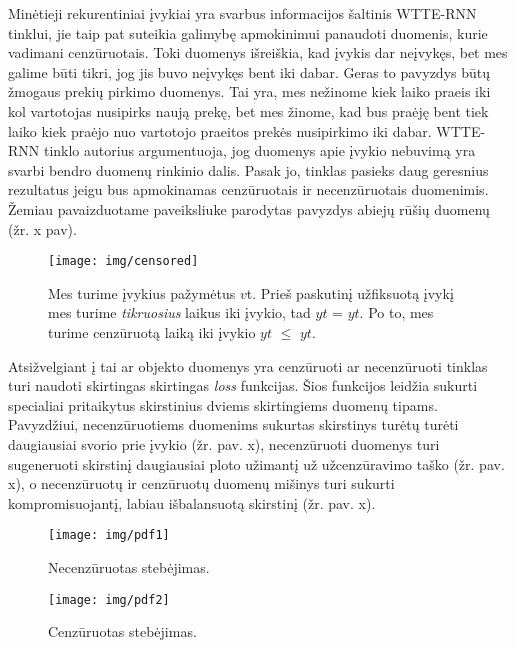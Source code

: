 \documentclass{VUMIFPSkursinis}
\begin{document}
Minėtieji rekurentiniai įvykiai yra svarbus informacijos šaltinis WTTE-RNN tinklui, jie taip pat suteikia galimybę apmokinimui panaudoti duomenis, kurie vadimani cenzūruotais. Toki duomenys išreiškia, kad įvykis dar neįvykęs, bet mes galime būti tikri, jog jis buvo neįvykęs bent iki dabar. Geras to pavyzdys būtų žmogaus prekių pirkimo duomenys. Tai yra, mes nežinome kiek laiko praeis iki kol vartotojas nusipirks naują prekę, bet mes žinome, kad bus praėję bent tiek laiko kiek praėjo nuo vartotojo praeitos prekės nusipirkimo iki dabar. WTTE-RNN tinklo autorius argumentuoja, jog duomenys apie įvykio nebuvimą yra svarbi bendro duomenų rinkinio dalis. Pasak jo, tinklas pasieks daug geresnius rezultatus jeigu bus apmokinamas cenzūruotais ir necenzūruotais duomenimis. Žemiau pavaizduotame paveiksliuke parodytas pavyzdys abiejų rūšių duomenų (žr. x pav).

\begin{figure}[H]
  \centering
  \texttt{[image: img/censored]}
  \caption{ Mes turime įvykius pažymėtus $v${\scriptsize t}. Prieš paskutinį užfiksuotą įvykį mes turime \textit{tikruosius} laikus iki įvykio, tad \~{$y$}{\scriptsize $t$} = $y${\scriptsize $t$}. Po to, mes turime cenzūruotą laiką iki įvykio \~{$y$}{\scriptsize $t$} $\leq$ {$y$}{\scriptsize $t$}\cite{WTTEBLOG}.}
  \label{img:censored}
\end{figure}

Atsižvelgiant į tai ar objekto duomenys yra cenzūruoti ar necenzūruoti tinklas turi naudoti skirtingas skirtingas \textit{loss} funkcijas. Šios funkcijos leidžia sukurti specialiai pritaikytus skirstinius dviems skirtingiems duomenų tipams. Pavyzdžiui, necenzūruotiems duomenims sukurtas skirstinys turėtų turėti daugiausiai svorio prie įvykio (žr. pav. x), necenzūruoti duomenys turi sugeneruoti skirstinį daugiausiai ploto užimantį už užcenzūravimo taško (žr. pav. x), o necenzūruotų ir cenzūruotų duomenų mišinys turi sukurti kompromisuojantį, labiau išbalansuotą skirstinį (žr. pav. x).  

\begin{figure}[H]
  \centering
  \texttt{[image: img/pdf1]}
  \caption{ Necenzūruotas stebėjimas\cite{WTTEBLOG}.}
  \label{img:pdf1}
\end{figure}


\begin{figure}[H]
  \centering
  \texttt{[image: img/pdf2]}
  \caption{ Cenzūruotas stebėjimas\cite{WTTEBLOG}.}
  \label{img:pdf2}
\end{figure}
\end{document}
